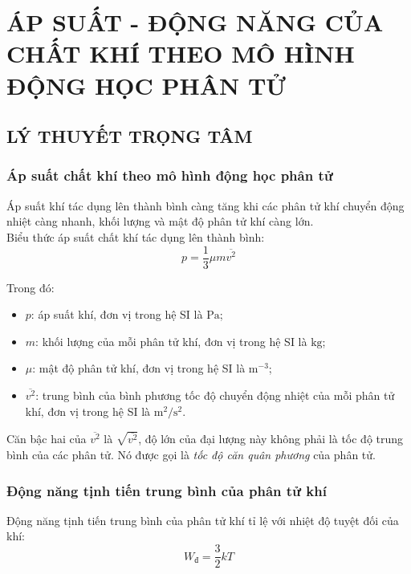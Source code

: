 \section{ÁP SUẤT - ĐỘNG NĂNG CỦA CHẤT KHÍ THEO MÔ HÌNH ĐỘNG HỌC PHÂN TỬ}
\subsection{LÝ THUYẾT TRỌNG TÂM}
\begin{tomtat}
	\subsubsection{Áp suất chất khí theo mô hình động học phân tử}
	\begin{boxdl}
		Áp suất khí tác dụng lên thành bình càng tăng khi các phân tử khí chuyển động nhiệt càng nhanh, khối lượng và mật độ phân tử khí càng lớn.\\
		Biểu thức áp suất chất khí tác dụng lên thành bình:
		\begin{equation}
			p=\dfrac{1}{3}\mu m\overline{v^2}
		\end{equation}
	\end{boxdl}
	Trong đó:
	\begin{itemize}
		\item $p$: áp suất khí, đơn vị trong hệ SI là $\si{\pascal}$;
		\item $m$: khối lượng của mỗi phân tử khí, đơn vị trong hệ SI là $\si{\kilogram}$;
		\item $\mu$: mật độ phân tử khí, đơn vị trong hệ SI là $\si{\meter^{-3}}$;
		\item $\overline{v^2}$: trung bình của bình phương tốc độ chuyển động nhiệt của mỗi phân tử khí, đơn vị trong hệ SI là $\si{\meter^2/\second^2}$.
	\end{itemize}
	\begin{luuy}
		Căn bậc hai của $\overline{v^2}$ là $\sqrt{\overline{v^2}}$, độ lớn của đại lượng này không phải là tốc độ trung bình của các phân tử. Nó được gọi là \textit{tốc độ căn quân phương} của phân tử.
	\end{luuy}
	\subsubsection{Động năng tịnh tiến trung bình của phân tử khí}
	\begin{boxdl}
		Động năng tịnh tiến trung bình của phân tử khí tỉ lệ với nhiệt độ tuyệt đối của khí:
		\begin{equation}
			W_\text{đ}=\dfrac{3}{2}kT
		\end{equation}
		

\end{boxdl}
\end{tomtat}
